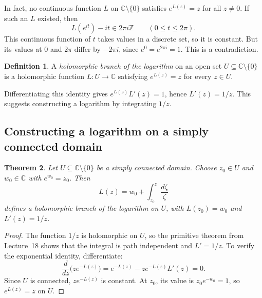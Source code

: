 \documentclass[11pt]{article}
\theoremstyle{plain}
\newtheorem{theorem}{Theorem}[section]
\theoremstyle{definition}
\newtheorem{definition}[theorem]{Definition}
\theoremstyle{remark}
\numberwithin{equation}{section}
\newcommand{\C}{\mathbb{C}}
\newcommand{\Z}{\mathbb{Z}}
\newenvironment{lecturefigure}
 {\par\addvspace{0.25em}\begingroup\setlength{\parskip}{0pt}\centering}
 {\par\endgroup\addvspace{0.25em}}
\begin{document}
\begin{lecturefigure}
\end{lecturefigure}

In fact, no continuous function $L$ on $\C\setminus\{0\}$ satisfies
$e^{L(z)}=z$ for all $z\ne0$. If such an $L$ existed, then
\[
 L(e^{it})-it\in2\pi i\Z\qquad(0\leq t\leq2\pi).
\]
This continuous function of $t$ takes values in a discrete set, so it
is constant. But its values at $0$ and $2\pi$ differ by $-2\pi i$,
since $e^0=e^{2\pi i}=1$. This is a contradiction.

\begin{definition}
A \emph{holomorphic branch of the logarithm} on an open set
$U\subseteq\C\setminus\{0\}$ is a holomorphic function $L\colon U\to\C$
satisfying $e^{L(z)}=z$ for every $z\in U$.
\end{definition}
Differentiating this identity gives $e^{L(z)}L'(z)=1$, hence
$L'(z)=1/z$. This suggests constructing a logarithm by integrating $1/z$.

\subsection{Constructing a logarithm on a simply connected domain}
\begin{theorem}\label{thm:log-z}
Let $U\subseteq\C\setminus\{0\}$ be a simply connected domain. Choose $z_0\in U$
and $w_0\in\C$ with $e^{w_0}=z_0$. Then
\[
 \boxed{\displaystyle L(z)=w_0+\int_{z_0}^z\frac{d\zeta}{\zeta}}
\]
defines a holomorphic branch of the logarithm on $U$, with
$L(z_0)=w_0$ and $L'(z)=1/z$.
\end{theorem}
\begin{proof}
The function $1/z$ is holomorphic on $U$, so the primitive theorem from Lecture~18
shows that the integral is path independent and $L'=1/z$.
To verify the exponential identity, differentiate:
\[
 \frac{d}{dz}\bigl(ze^{-L(z)}\bigr)
 =e^{-L(z)}-ze^{-L(z)}L'(z)=0.
\]
Since $U$ is connected, $ze^{-L(z)}$ is constant. At $z_0$, its value
is $z_0e^{-w_0}=1$, so $e^{L(z)}=z$ on $U$.
\end{proof}
\end{document}
